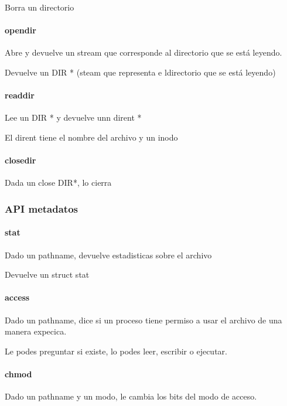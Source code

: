 \documentclass{article}
\begin{document}
Borra un directorio

\paragraph{opendir}\label{opendir}

Abre y devuelve un stream que corresponde al directorio que se está
leyendo.

Devuelve un DIR * (steam que representa e ldirectorio que se está
leyendo)

\paragraph{readdir}\label{readdir}

Lee un DIR * y devuelve unn dirent *

El dirent tiene el nombre del archivo y un inodo

\paragraph{closedir}\label{closedir}

Dada un close DIR*, lo cierra

\subsubsection{API metadatos}\label{api-metadatos}

\paragraph{stat}\label{stat}

Dado un pathname, devuelve estadisticas sobre el archivo

Devuelve un struct stat

\paragraph{access}\label{access}

Dado un pathname, dice si un proceso tiene permiso a usar el archivo de
una manera expecica.

Le podes preguntar si existe, lo podes leer, escribir o ejecutar.

\paragraph{chmod}\label{chmod}

Dado un pathname y un modo, le cambia los bits del modo de acceso.
\end{document}

